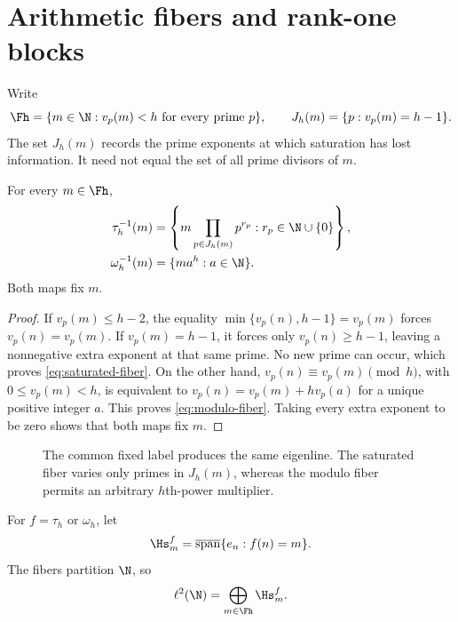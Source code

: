 \section{Arithmetic fibers and rank-one blocks}
\label{sec:fibers}

Write
\[
  \Fh=\{m\in\N:v_p(m)<h\ \text{for every prime }p\},
  \qquad
  J_h(m)=\{p:v_p(m)=h-1\}.
\]
The set $J_h(m)$ records the prime exponents at which saturation has lost
information.  It need not equal the set of all prime divisors of $m$.

\begin{lemma}
\label{lem:fibers}
For every $m\in\Fh$,
\begin{align}
  \tau_h^{-1}(m)
    &=\left\{m\prod_{p\in J_h(m)}p^{r_p}:r_p\in\N\cup\{0\}\right\},
      \label{eq:saturated-fiber}\\
  \omega_h^{-1}(m)
    &=\{ma^h:a\in\N\}.
      \label{eq:modulo-fiber}
\end{align}
Both maps fix $m$.
\end{lemma}

\begin{proof}
If $v_p(m)\le h-2$, the equality
$\min\{v_p(n),h-1\}=v_p(m)$ forces $v_p(n)=v_p(m)$.  If
$v_p(m)=h-1$, it forces only $v_p(n)\ge h-1$, leaving a nonnegative
extra exponent at that same prime.  No new prime can occur, which proves
\cref{eq:saturated-fiber}.  On the other hand,
$v_p(n)\equiv v_p(m)\pmod h$, with $0\le v_p(m)<h$, is equivalent to
$v_p(n)=v_p(m)+h v_p(a)$ for a unique positive integer $a$.  This proves
\cref{eq:modulo-fiber}.  Taking every extra exponent to be zero shows that
both maps fix $m$.
\end{proof}

\begin{figure}[t]
  \centering
  \resizebox{\linewidth}{!}{}
  \caption{The common fixed label produces the same eigenline.  The
  saturated fiber varies only primes in $J_h(m)$, whereas the modulo fiber
  permits an arbitrary $h$th-power multiplier.}
  \label{fig:fibers}
\end{figure}

For $f=\tau_h$ or $\omega_h$, let
\[
  \Hs_m^f=\overline{\operatorname{span}}\{e_n:f(n)=m\}.
\]
The fibers partition $\N$, so
\begin{equation}
  \ell^2(\N)=\bigoplus_{m\in\Fh}\Hs_m^f.
  \label{eq:block-decomp}
\end{equation}

